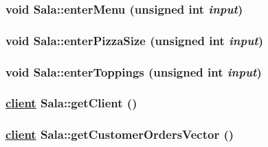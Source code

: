 \hypertarget{class_sala_1015bfdd699f9dc90a677a87def0b37b}{
\subsubsection[enterMenu]{\setlength{\rightskip}{0pt plus 5cm}void Sala::enter\-Menu (unsigned int {\em input})}}
\label{class_sala_1015bfdd699f9dc90a677a87def0b37b}


\hypertarget{class_sala_caeeb8aada209ebb8bde4749b2ececdc}{
\subsubsection[enterPizzaSize]{\setlength{\rightskip}{0pt plus 5cm}void Sala::enter\-Pizza\-Size (unsigned int {\em input})}}
\label{class_sala_caeeb8aada209ebb8bde4749b2ececdc}


\hypertarget{class_sala_34479ade70e563ba9c7eb9b66df2270e}{
\subsubsection[enterToppings]{\setlength{\rightskip}{0pt plus 5cm}void Sala::enter\-Toppings (unsigned int {\em input})}}
\label{class_sala_34479ade70e563ba9c7eb9b66df2270e}


\hypertarget{class_sala_a1300ce1d3137fc3bd1b2938612faa1b}{
\subsubsection[getClient]{\setlength{\rightskip}{0pt plus 5cm}\hyperlink{classclient}{client} Sala::get\-Client ()}}
\label{class_sala_a1300ce1d3137fc3bd1b2938612faa1b}


\hypertarget{class_sala_3a31e5a83058a950f863932d3ecaef2e}{
\subsubsection[getCustomerOrdersVector]{\setlength{\rightskip}{0pt plus 5cm}\hyperlink{classclient}{client} Sala::get\-Customer\-Orders\-Vector ()}}
\label{class_sala_3a31e5a83058a950f863932d3ecaef2e}


